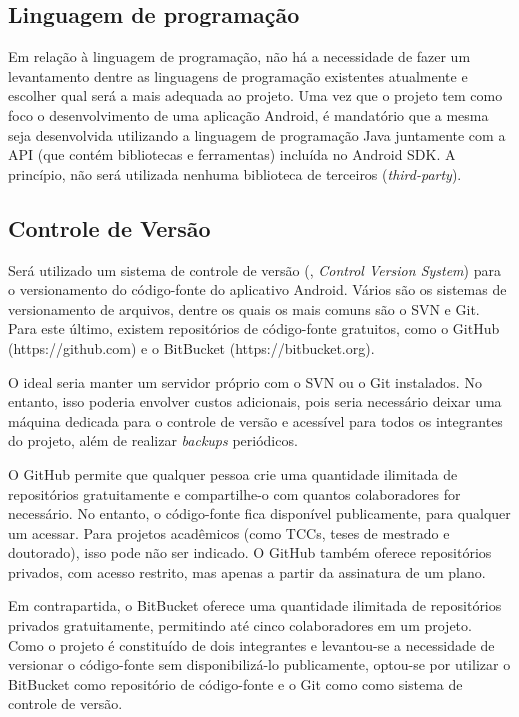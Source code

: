 \subsection{Linguagem de programação}

Em relação à linguagem de programação, não há a necessidade de fazer um levantamento dentre as linguagens de programação existentes atualmente e escolher qual será a mais adequada ao projeto. Uma vez que o projeto tem como foco o desenvolvimento de uma aplicação Android, é mandatório que a mesma seja desenvolvida utilizando a linguagem de programação Java juntamente com a API (que contém bibliotecas e ferramentas) incluída no Android SDK. A princípio, não será utilizada nenhuma biblioteca de terceiros (\emph{third-party}).

\subsection{Controle de Versão}

Será utilizado um sistema de controle de versão (, \emph{Control Version System}) para o versionamento do código-fonte do aplicativo Android. Vários são os sistemas de versionamento de arquivos, dentre os quais os mais comuns são o SVN e Git. Para este último, existem repositórios de código-fonte gratuitos, como o GitHub (https://github.com) e o BitBucket (https://bitbucket.org).

O ideal seria manter um servidor próprio com o SVN ou o Git instalados. No entanto, isso poderia envolver custos adicionais, pois seria necessário deixar uma máquina dedicada para o controle de versão e acessível para todos os integrantes do projeto, além de realizar \emph{backups} periódicos.

O GitHub permite que qualquer pessoa crie uma quantidade ilimitada de repositórios gratuitamente e compartilhe-o com quantos colaboradores for necessário. No entanto, o código-fonte fica disponível publicamente, para qualquer um acessar. Para projetos acadêmicos (como TCCs, teses de mestrado e doutorado), isso pode não ser indicado. O GitHub também oferece repositórios privados, com acesso restrito, mas apenas a partir da assinatura de um plano.

Em contrapartida, o BitBucket oferece uma quantidade ilimitada de repositórios privados gratuitamente, permitindo até cinco colaboradores em um projeto. Como o projeto é constituído de dois integrantes e levantou-se a necessidade de versionar o código-fonte sem disponibilizá-lo publicamente, optou-se por utilizar o BitBucket como repositório de código-fonte e o Git como como sistema de controle de versão.

